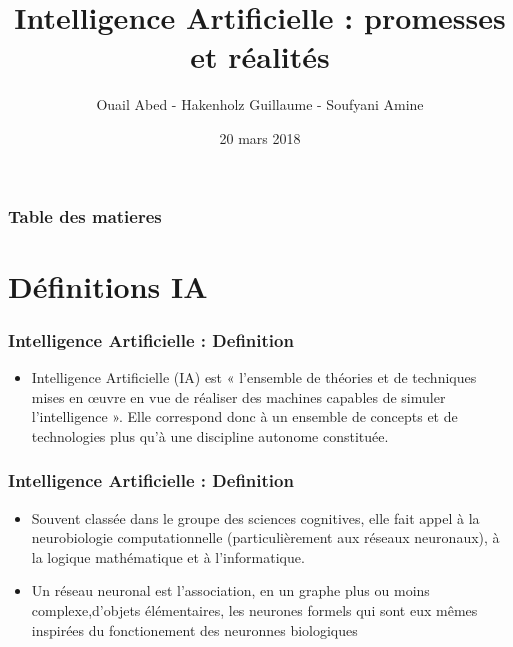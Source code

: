 \documentclass{beamer}
\title{Intelligence Artificielle : promesses et réalités}
\author{Ouail Abed - Hakenholz Guillaume - Soufyani Amine}
\date{20 mars 2018}
\begin{document}
	\begin{frame}
	\titlepage
	\end{frame}
	
	\begin{frame}
	\frametitle{Table des matieres}
	\tableofcontents
	\end{frame}
	
	
	\section{Définitions IA}
	\begin{frame}
	\frametitle{Intelligence Artificielle : Definition}
	\begin{itemize}
		\item Intelligence Artificielle (IA) est « l'ensemble de théories et de techniques mises en œuvre en vue de réaliser des machines capables de simuler l'intelligence ». Elle correspond donc à un ensemble 	de concepts et de technologies plus qu'à une discipline autonome constituée.
	\end{itemize}
	\end{frame}
	
	\begin{frame}
	\frametitle{Intelligence Artificielle : Definition}
	\begin{itemize}
		\itemsep2em
		\item Souvent classée dans le groupe des sciences cognitives, elle fait appel à la neurobiologie 					computationnelle (particulièrement aux réseaux neuronaux), à la logique mathématique et à 							l'informatique. 
		
		\item Un réseau neuronal est l’association, en un graphe plus ou moins 															complexe,d’objets élémentaires, les neurones formels qui sont eux mêmes inspirées du fonctionement 		des neuronnes biologiques
	\end{itemize}
	\end{frame}
	
	
\end{document}
